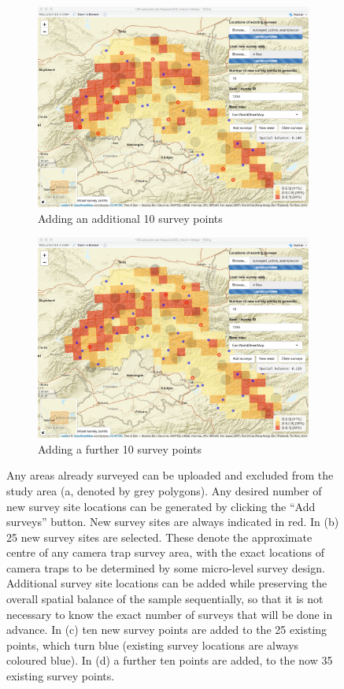 \documentclass[a4paper,11pt]{article} %
\begin{document}
\begin{figure}[htbp]
\begin{subfigure}[b]{0.49\textwidth}
    \includegraphics[width=\textwidth]{mac-8}
    \caption{Adding an additional 10 survey points}
  \end{subfigure}
  \begin{subfigure}[b]{0.49\textwidth}
    \includegraphics[width=\textwidth]{mac-9}
    \caption{Adding a further 10 survey points}
  \end{subfigure}
  \caption{Any areas already surveyed can be uploaded and excluded from the study area (a, denoted by grey polygons). Any desired number of new survey site locations can be generated by clicking the ``Add surveys'' button. New survey sites are always indicated in red. In (b) 25 new survey sites are selected. These denote the approximate centre of any camera trap survey area, with the exact locations of camera traps to be determined by some micro-level survey design. Additional survey site locations can be added while preserving the overall spatial balance of the sample sequentially, so that it is not necessary to know the exact number of surveys that will be done in advance. In (c) ten new survey points are added to the 25 existing points, which turn blue (existing survey locations are always coloured blue). In (d) a further ten points are added, to the now 35 existing survey points.}
\label{mac-6789}
\end{figure}
 
\end{document}
